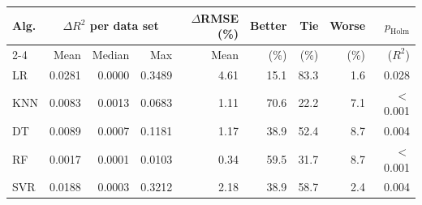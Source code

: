 \begin{tabular}{lrrrrrrrr}
\toprule
\textbf{Alg.} & \multicolumn{3}{c}{\textbf{$\Delta R^2$ per data set}} & \textbf{$\Delta$RMSE (\%)} & \textbf{Better} & \textbf{Tie} & \textbf{Worse} & \textbf{$p_{\text{Holm}}$} \\
\cmidrule(lr){2-4}
& Mean & Median & Max & Mean & (\%) & (\%) & (\%) & ($R^2$) \\
\midrule
LR & 0.0281 & 0.0000 & 0.3489 & 4.61 & 15.1 & 83.3 & 1.6 & 0.028 \\
KNN & 0.0083 & 0.0013 & 0.0683 & 1.11 & 70.6 & 22.2 & 7.1 & $<$0.001 \\
DT & 0.0089 & 0.0007 & 0.1181 & 1.17 & 38.9 & 52.4 & 8.7 & 0.004 \\
RF & 0.0017 & 0.0001 & 0.0103 & 0.34 & 59.5 & 31.7 & 8.7 & $<$0.001 \\
SVR & 0.0188 & 0.0003 & 0.3212 & 2.18 & 38.9 & 58.7 & 2.4 & 0.004 \\
\bottomrule
\end{tabular}
